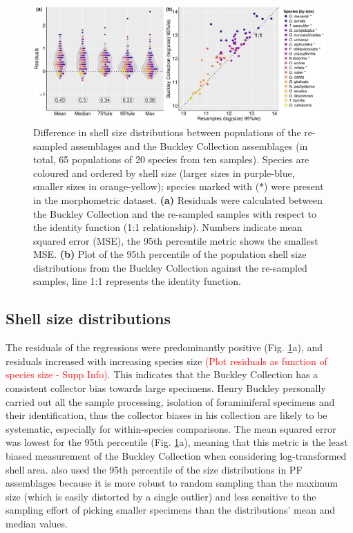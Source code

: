 \documentclass[a4paper]{article}
\begin{document}
\begin{figure}[htbp]
\caption{
Difference in shell size distributions between populations of the re-sampled assemblages and the Buckley Collection assemblages (in total, 65 populations of 20 species from ten samples). Species are coloured and ordered by shell size (larger sizes in purple-blue, smaller sizes in orange-yellow); species marked with ($*$) were present in the morphometric dataset.
\textbf{(a)} Residuals were calculated between the Buckley Collection and the re-sampled samples with respect to the identity function (1:1 relationship). Numbers indicate mean squared error (MSE), the 95th percentile metric shows the smallest MSE. 
\textbf{(b)} Plot of the 95th percentile of the population shell size distributions from the Buckley Collection against the re-sampled samples, line 1:1 represents the identity function. }
\label{fig_violin_95q}
\centering
\includegraphics[scale=0.12]{fig_violin_95q.png}
\end{figure}


\subsection{Shell size distributions}

The residuals of the regressions were predominantly positive (Fig. \ref{fig_violin_95q}a), and residuals increased with increasing species size \textcolor{red}{(Plot residuals as function of species size - Supp Info)}. This indicates that the Buckley Collection has a consistent collector bias towards large specimens. Henry Buckley personally carried out all the sample processing, isolation of foraminiferal specimens and their identification, thus the collector biases in his collection are likely to be systematic, especially for within-species comparisons. 
The mean squared error was lowest for the 95th percentile (Fig. \ref{fig_violin_95q}a), meaning that this metric is the least biased measurement of the Buckley Collection when considering log-transformed shell area.
\cite{schmidt2004size} also used the 95th percentile of the size distributions in PF assemblages because it is more robust to random sampling than the maximum size (which is easily distorted by a single outlier) and less sensitive to the sampling effort of picking smaller specimens than the distributions' mean and median values.
\end{document}
